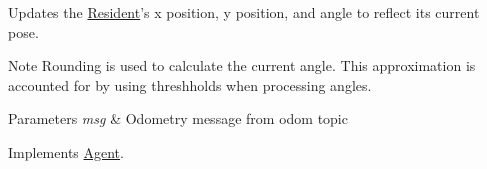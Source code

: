 Updates the \hyperlink{classResident}{Resident}'s x position, y position, and angle to reflect its current pose. 

\begin{DoxyNote}{Note}
Rounding is used to calculate the current angle. This approximation is accounted for by using threshholds when processing angles. 
\end{DoxyNote}

\begin{DoxyParams}{Parameters}
{\em msg} & Odometry message from odom topic \\
\hline
\end{DoxyParams}


Implements \hyperlink{classAgent_a4b1182b9ee5dccaa871d71beef94a7d2}{Agent}.



